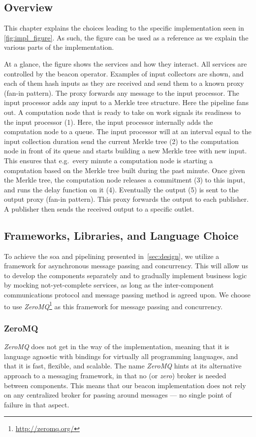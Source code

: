 \subsection{Overview}%
\label{sub:overview}
This chapter explains the choices leading to the specific implementation seen in \vref{fig:impl_figure}. As such, the figure can be used as a reference as we explain the various parts of the implementation.

At a glance, the figure shows the services and how they interact.
All services are controlled by the beacon operator.
Examples of input collectors are shown, and each of them hash inputs as they are received and send them to a known proxy (fan-in pattern).
The proxy forwards any message to the input processor.
The input processor adds any input to a Merkle tree structure.
Here the pipeline fans out.
A computation node that is ready to take on work signals its readiness to the input processor (1).
Here, the input processor internally adds the computation node to a queue.
The input processor will at an interval equal to the input collection duration send the current Merkle tree (2) to the computation node in front of its queue and starts building a new Merkle tree with new input.
This ensures that e.g.\ every minute a computation node is starting a computation based on the Merkle tree built during the past minute.
Once given the Merkle tree, the computation node releases a commitment (3) to this input, and runs the delay function on it (4).
Eventually the output (5) is sent to the output proxy (fan-in pattern).
This proxy forwards the output to each publisher.
A publisher then sends the received output to a specific outlet.

\subsection{Frameworks, Libraries, and Language Choice}
To achieve the \acrfull{soa} and pipelining presented in~\cref{sec:design}, we utilize a framework for asynchronous message passing and concurrency.
This will allow us to develop the components separately and to gradually implement business logic by mocking not-yet-complete services, as long as the inter-component communications protocol and message passing method is agreed upon.
We choose to use \textit{ZeroMQ}\footnote{\url{http://zeromq.org/}} as this framework for message passing and concurrency.

\subsubsection{ZeroMQ}
\textit{ZeroMQ} does not get in the way of the implementation, meaning that it is language agnostic with bindings for virtually all programming languages, and that it is fast, flexible, and scalable.
The name \textit{ZeroMQ} hints at its alternative approach to a messaging framework, in that no (or \textit{zero}) broker is needed between components.
This means that our beacon implementation does not rely on any centralized broker for passing around messages --- no single point of failure in that aspect.

